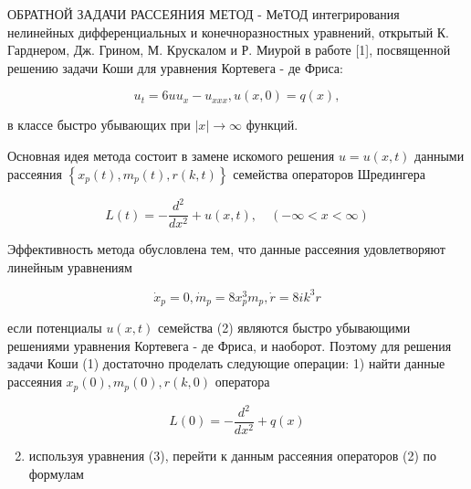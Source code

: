 \documentclass[10pt]{article}
\begin{document}
ОБРАТНОЙ ЗАДАЧИ РАССЕЯНИЯ МЕТОД - МеТОД интегрирования нелинейных дифференциальных и конечноразностных уравнений, открытый К. Гарднером, Дж. Грином, М. Крускалом и Р. Миурой в работе [1], посвященной решению задачи Коши для уравнения Кортевега - де Фриса:



\[

u_{t}=6 u u_{x}-u_{x x x}, u(x, 0)=q(x),

\]



в классе быстро убывающих при $|x| \rightarrow \infty$ функций.



Основная идея метода состоит в замене искомого решения $u=u(x, t)$ данными рассеяния $\left\{x_{p}(t), m_{p}(t), r(k, t)\right\}$ семейства операторов Шредингера



\[

L(t)=-\frac{d^{2}}{d x^{2}}+u(x, t), \quad(-\infty<x<\infty)

\]



Эффективность метода обусловлена тем, что данные рассеяния удовлетворяют линейным уравнениям



\[

\dot{x}_{p}=0, \dot{m}_{p}=8 x_{p}^{3} m_{p}, \dot{r}=8 i k^{3} r

\]



если потенциалы $u(x, t)$ семейства (2) являются быстро убывающими решениями уравнения Кортевега - де Фриса, и наоборот. Поэтому для решения задачи Коши (1) достаточно проделать следующие операции: 1) найти данные рассеяния $x_{p}(0), m_{p}(0), r(k, 0)$ оператора



\[

L(0)=-\frac{d^{2}}{d x^{2}}+q(x)

\]



\begin{enumerate}

  \setcounter{enumi}{1}

  \item используя уравнения (3), перейти к данным рассеяния операторов (2) по формулам

\end{enumerate}
\end{document}
